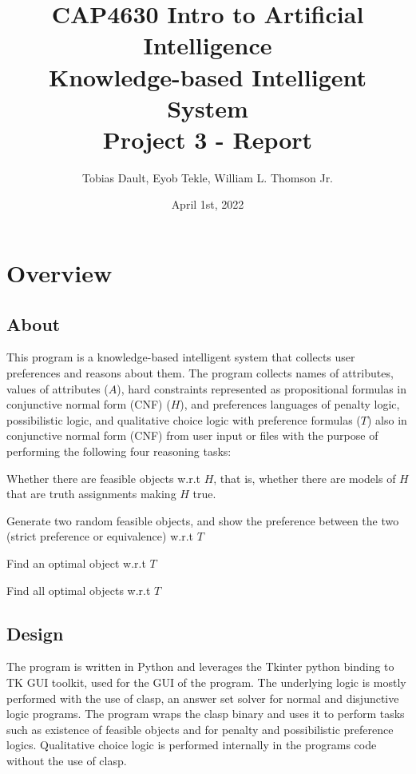\documentclass[12pt]{report}
\title{\textbf{CAP4630 Intro to Artificial Intelligence \\ Knowledge-based
Intelligent System \\ Project 3 - Report}}
\author{Tobias Dault, Eyob Tekle, William L. Thomson Jr.}
\date{April 1st, 2022}
\begin{document}
\maketitle
\tableofcontents
\thispagestyle{empty}

\chapter{Overview}
\section{About}
This program is a knowledge-based intelligent system that collects user preferences and reasons about them. The program collects names of attributes, values of attributes ($A$), hard constraints represented as propositional formulas in conjunctive normal form (CNF) ($H$), and preferences languages of penalty logic, possibilistic logic, and qualitative choice logic with preference formulas ($T$) also in conjunctive normal form (CNF) from user input or files with the purpose of performing the following four reasoning tasks: \\

\begin{description}[style=multiline,leftmargin=12em]
  \item [Existence of Feasible Objects] Whether there are feasible objects w.r.t $H$,
that is, whether there are models of $H$ that are truth assignments making $H$ true.
  \item [Exemplification] Generate two random feasible objects, and show the preference between the two (strict preference or equivalence) w.r.t $T$
  \item [Optimization] Find an optimal object w.r.t $T$
  \item [Omni-Optimization] Find all optimal objects w.r.t $T$
\end{description}

\section{Design}
The program is written in Python and leverages the Tkinter python binding to TK GUI toolkit, used for the GUI of the program. The underlying logic is mostly performed with the use of clasp, an answer set solver for normal and disjunctive logic programs. The program wraps the clasp binary and uses it to perform tasks such as existence of feasible objects and for penalty and possibilistic preference logics. Qualitative choice logic is performed internally in the programs code without the use of clasp.
\end{document}

